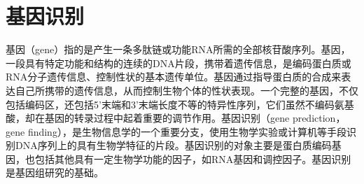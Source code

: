 \section{基因识别}
基因（gene）指的是产生一条多肽链或功能RNA所需的全部核苷酸序列。基因，一段具有特定功能和结构的连续的DNA片段，携带着遗传信息，是编码蛋白质或RNA分子遗传信息、控制性状的基本遗传单位。基因通过指导蛋白质的合成来表达自己所携带的遗传信息，从而控制生物个体的性状表现。一个完整的基因，不仅包括编码区，还包括5'末端和3'末端长度不等的特异性序列，它们虽然不编码氨基酸，却在基因的转录过程中起着重要的调节作用。基因识别（gene prediction，gene finding），是生物信息学的一个重要分支，使用生物学实验或计算机等手段识别DNA序列上的具有生物学特征的片段。基因识别的对象主要是蛋白质编码基因，也包括其他具有一定生物学功能的因子，如RNA基因和调控因子。基因识别是基因组研究的基础。


